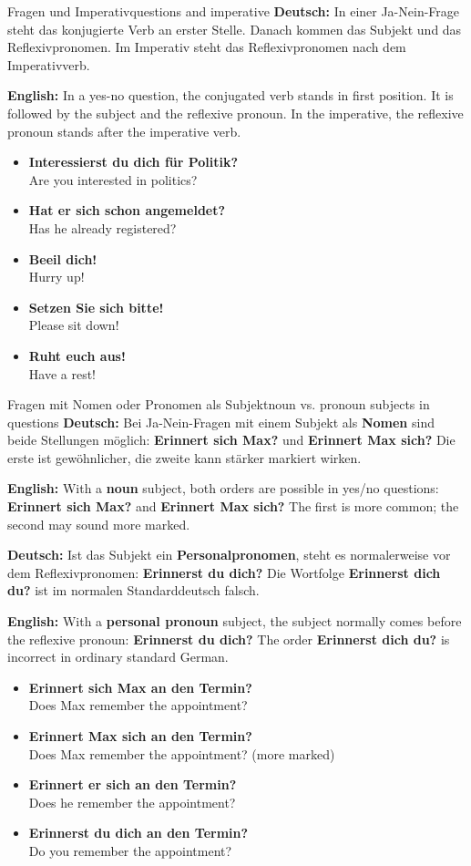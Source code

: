 \documentclass[a4paper,11pt]{article}
\newcommand{\GermanText}[1]{\textbf{Deutsch: }#1\par}
\newcommand{\EnglishText}[1]{{\small\color{SoftGray}\textbf{English: }#1\par}}
\newcommand{\ExampleItem}[2]{\item \textbf{#1}\\{\small\color{SoftGray}#2}}
\begin{document}
        \begin{grammarentry}{Fragen und Imperativ}{questions and imperative}
            \GermanText{In einer Ja-Nein-Frage steht das konjugierte Verb an erster Stelle. Danach kommen das Subjekt und das Reflexivpronomen. Im Imperativ steht das Reflexivpronomen nach dem Imperativverb.}
            \EnglishText{In a yes-no question, the conjugated verb stands in first position. It is followed by the subject and the reflexive pronoun. In the imperative, the reflexive pronoun stands after the imperative verb.}

            \begin{exbox}
                \begin{itemize}
                    \ExampleItem{Interessierst du dich für Politik?}{Are you interested in politics?}
                    \ExampleItem{Hat er sich schon angemeldet?}{Has he already registered?}
                    \ExampleItem{Beeil dich!}{Hurry up!}
                    \ExampleItem{Setzen Sie sich bitte!}{Please sit down!}
                    \ExampleItem{Ruht euch aus!}{Have a rest!}
                \end{itemize}
            \end{exbox}
        \end{grammarentry}


        \begin{grammarentry}{Fragen mit Nomen oder Pronomen als Subjekt}{noun vs. pronoun subjects in questions}
            \GermanText{Bei Ja-Nein-Fragen mit einem Subjekt als \textbf{Nomen} sind beide Stellungen möglich: \textbf{Erinnert sich Max?} und \textbf{Erinnert Max sich?} Die erste ist gewöhnlicher, die zweite kann stärker markiert wirken.}
            \EnglishText{With a \textbf{noun} subject, both orders are possible in yes/no questions: \textbf{Erinnert sich Max?} and \textbf{Erinnert Max sich?} The first is more common; the second may sound more marked.}
            \GermanText{Ist das Subjekt ein \textbf{Personalpronomen}, steht es normalerweise vor dem Reflexivpronomen: \textbf{Erinnerst du dich?} Die Wortfolge \textbf{Erinnerst dich du?} ist im normalen Standarddeutsch falsch.}
            \EnglishText{With a \textbf{personal pronoun} subject, the subject normally comes before the reflexive pronoun: \textbf{Erinnerst du dich?} The order \textbf{Erinnerst dich du?} is incorrect in ordinary standard German.}
            \begin{exbox}
                \begin{itemize}
                    \ExampleItem{Erinnert sich Max an den Termin?}{Does Max remember the appointment?}
                    \ExampleItem{Erinnert Max sich an den Termin?}{Does Max remember the appointment? (more marked)}
                    \ExampleItem{Erinnert er sich an den Termin?}{Does he remember the appointment?}
                    \ExampleItem{Erinnerst du dich an den Termin?}{Do you remember the appointment?}
                \end{itemize}
            \end{exbox}
        \end{grammarentry}
\end{document}

